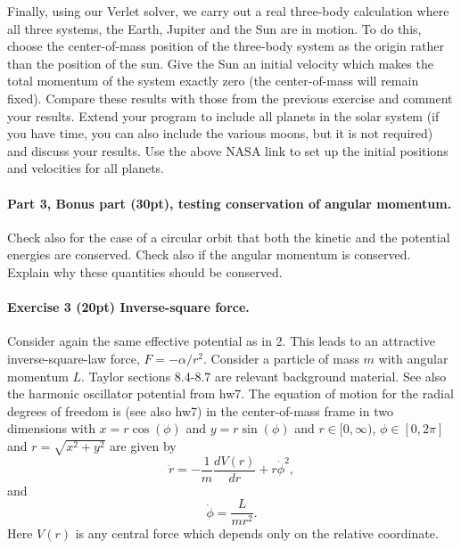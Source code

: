 \documentclass[%
oneside,                 %
final,                   %
10pt]{article}
\begin{document}
Finally, using our Verlet solver, we carry out a real three-body calculation where all three systems, 
the Earth, Jupiter and the Sun are in motion. To do this, choose the center-of-mass position of the three-body system as 
the origin rather than the position of the sun. Give the Sun an initial velocity which makes the total momentum of the system exactly zero (the center-of-mass will remain fixed). Compare these results with those from the previous exercise and comment your results. Extend your program to include all planets in the solar system (if you have time, you can also include the various moons, but it is not required) and discuss your results. Use the above NASA link  to set up the initial positions and velocities for all planets. 



\paragraph{Part 3, Bonus part (30pt), testing conservation of angular momentum.}
Check also for the case of a circular orbit that both the kinetic and the potential energies are conserved.
Check also if the  angular momentum is conserved. Explain why these quantities
should be conserved.





\paragraph{Exercise 3 (20pt) Inverse-square force.}
Consider again the same effective potential as in 2. This leads to an attractive inverse-square-law force, $F=-\alpha/r^2$. Consider a particle of mass $m$ with angular momentum $L$. Taylor sections 8.4-8.7 are relevant background material.  See also the harmonic oscillator potential from hw7. The equation of motion for the radial degrees of freedom is (see also hw7) in the center-of-mass frame in two dimensions with $x=r\cos{(\phi)}$ and $y=r\sin{(\phi)}$ and
$r\in [0,\infty)$, $\phi\in [0,2\pi]$ and $r=\sqrt{x^2+y^2}$ are given by
\[
\ddot{r}=-\frac{1}{m}\frac{dV(r)}{dr}+r\dot{\phi}^2,
\]
and
\[
\dot{\phi}=\frac{L}{m r^2}.
\]
Here $V(r)$ is any central force which depends only on the relative coordinate.
\end{document}
